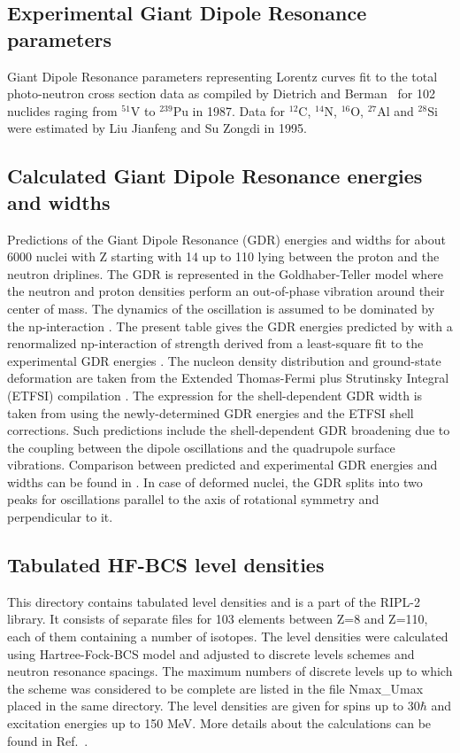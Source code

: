 \documentclass[twocolumn,amsmath,amssymb,10pt,groupedaddress,letter]{revtex4}
\begin{document}
\subsection{Experimental Giant Dipole Resonance parameters}
Giant Dipole Resonance parameters representing Lorentz curves fit
to the total photo-neutron cross section data as compiled by Dietrich
and Berman~\cite{die88} for 102 nuclides raging from
$^{51}$V to $^{239}$Pu in 1987. Data for $^{12}$C, $^{14}$N, $^{16}$O, $^{27}$Al and $^{28}$Si
were estimated by Liu Jianfeng and Su Zongdi in 1995.

\subsection{Calculated Giant Dipole Resonance energies and widths}
Predictions of the Giant Dipole Resonance (GDR) energies and widths
for about 6000 nuclei with Z starting with 14 up to 110 lying between
the proton and the neutron driplines. The GDR is represented in the
Goldhaber-Teller model \cite{Goldhaber48} where the neutron and proton
densities perform an out-of-phase vibration around their center of
mass. The dynamics of the oscillation is assumed to be dominated by
the np-interaction \cite{Isacker92}. The present table gives the
GDR energies predicted by \cite{Isacker92} with a renormalized np-interaction
of strength derived from a least-square fit to the experimental GDR
energies \cite{Goriely98}. The nucleon density distribution and ground-state
deformation are taken from the Extended Thomas-Fermi plus Strutinsky
Integral (ETFSI) compilation \cite{Goriely2000,Aboussir95}. The expression
for the shell-dependent GDR width is taken from \cite{Thielemann1983}
using the newly-determined GDR energies and the ETFSI shell corrections.
Such predictions include the shell-dependent GDR broadening due to
the coupling between the dipole oscillations and the quadrupole surface
vibrations. Comparison between predicted and experimental GDR energies
and widths can be found in \cite{Goriely98}. In case of deformed
nuclei, the GDR splits into two peaks for oscillations parallel to
the axis of rotational symmetry and perpendicular to it.

\subsection{Tabulated HF-BCS level densities}
This directory contains tabulated level densities
and is a part of the RIPL-2 library. It consists of separate
files for 103 elements between Z=8 and Z=110, each of them containing
a number of isotopes. The level densities were calculated using Hartree-Fock-BCS
model and adjusted to discrete levels schemes and neutron resonance
spacings. The maximum numbers of discrete levels up to which the scheme
was considered to be complete are listed in the file Nmax\_Umax placed
in the same directory. The level densities are given for spins up
to 30$\hbar$ and excitation energies up to 150 MeV. More details
about the calculations can be found in Ref.~\cite{HFBCS}.
\end{document}
